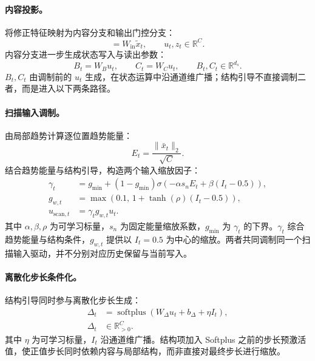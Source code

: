\documentclass[journal]{IEEEtran}
\begin{document}
\paragraph{内容投影。}
将修正特征映射为内容分支和输出门控分支：
\begin{equation}
[u_t,z_t]=W_{\mathrm{in}}\tilde{x}_t,
\qquad
u_t,z_t\in\mathbb{R}^{C}.
\label{eq:input_projection}
\end{equation}
内容分支进一步生成状态写入与读出参数：
\begin{equation}
B_t=W_Bu_t,\qquad C_t=W_Cu_t,
\qquad
B_t,C_t\in\mathbb{R}^{d_s}.
\label{eq:ssm_parameters}
\end{equation}
$B_t,C_t$ 由调制前的 $u_t$ 生成，在状态运算中沿通道维广播；结构引导不直接调制二者，而是进入以下两条路径。

\paragraph{扫描输入调制。}
由局部趋势计算逐位置趋势能量：
\begin{equation}
E_t=\frac{\|\bar{x}_t\|_2}{\sqrt{C}}.
\label{eq:trend_energy}
\end{equation}
结合趋势能量与结构引导，构造两个输入缩放因子：
\begin{align}
\gamma_t
&=g_{\min}+(1-g_{\min})
\sigma\!\left(-\alpha s_nE_t+\beta(I_t-0.5)\right),
\label{eq:energy_modulation}\\
g_{w,t}
&=\max\!\left(
0.1,\,1+\tanh(\rho)(I_t-0.5)
\right),
\label{eq:write_modulation}\\
u_{\mathrm{scan},t}
&=\gamma_tg_{w,t}u_t.
\label{eq:modulation}
\end{align}
其中 $\alpha,\beta,\rho$ 为可学习标量，$s_n$ 为固定能量缩放系数，$g_{\min}$ 为 $\gamma_t$ 的下界。$\gamma_t$ 综合趋势能量与结构条件，$g_{w,t}$ 提供以 $I_t=0.5$ 为中心的缩放。两者共同调制同一个扫描输入驱动，并不分别对应历史保留与当前写入。

\paragraph{离散化步长条件化。}
结构引导同时参与离散化步长生成：
\begin{equation}
\begin{aligned}
\Delta_t
&=\operatorname{softplus}\!\left(
W_{\Delta}u_t+b_{\Delta}+\eta I_t
\right),\\
\Delta_t
&\in\mathbb{R}_{>0}^{C}.
\end{aligned}
\label{eq:delta_condition}
\end{equation}
其中 $\eta$ 为可学习标量，$I_t$ 沿通道维广播。结构项加入 Softplus 之前的步长预激活值，使正值步长同时依赖内容与局部结构，而非直接对最终步长进行缩放。
\end{document}
